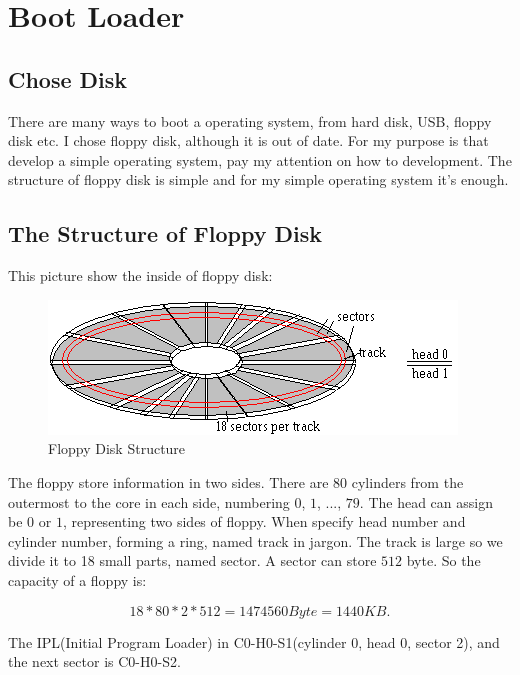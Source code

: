 \documentclass{swfcthesisp}
\begin{document}
\section{Boot Loader}

\subsection{Chose Disk}
\label{sec:chose-disk}

There are many ways to boot a operating system, from hard disk, USB, floppy disk etc. I
chose floppy disk, although it is out of date. For my purpose is that develop a simple
operating system, pay my attention on how to development. The structure of floppy disk is
simple and for my simple operating system it's enough.

\subsection{The Structure of Floppy Disk}
\label{sec:struct-floppy-disk}

This picture show the inside of floppy disk:
\begin{figure}[!ht]
  \centering
  \includegraphics[width=.5\textwidth]{flpy1}
  \caption{Floppy Disk Structure}
  \label{fig:flpy1.png}
\end{figure}

The floppy store information in two sides. There are $80$ cylinders from the outermost to
the core in each side, numbering $0$, $1$, ..., $79$. The head can assign be $0$ or $1$,
representing two sides of floppy. When specify head number and cylinder number, forming a
ring, named track in jargon. The track is large so we divide it to 18 small parts, named
sector. A sector can store $512$ byte. So the capacity of a floppy is:

$$18 * 80 * 2 * 512 = 1474560 Byte = 1440 KB.$$

The IPL(Initial Program Loader) in C0-H0-S1(cylinder 0, head 0, sector 2), and the next
sector is C0-H0-S2.
\end{document}
